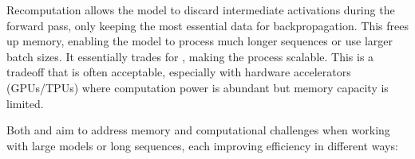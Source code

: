 \documentclass[letterpaper,11pt,english]{sphinxmanual}
\begin{document}
\begin{itemize}
\sphinxAtStartPar
Recomputation allows the model to discard intermediate activations
during the forward pass, only keeping the most essential data for
backpropagation. This frees up memory, enabling the model to process
much longer sequences or use larger batch sizes. It essentially trades
 for , making the
process scalable. This is a tradeoff that is often acceptable,
especially with hardware accelerators (GPUs/TPUs) where computation
power is abundant but memory capacity is limited.

\end{itemize}

\sphinxAtStartPar
Both  and  aim to address memory and
computational challenges when working with large models or long
sequences, each improving efficiency in different ways:
\end{document}
